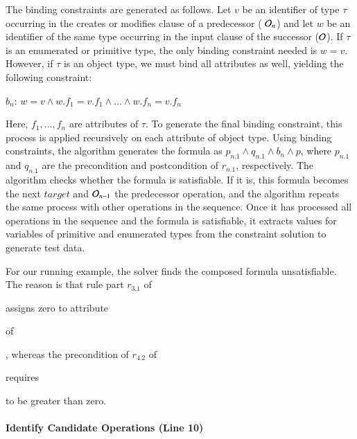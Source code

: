 The binding constraints are generated as follows. Let $v$ be an identifier of
type $\tau$ occurring in the creates or modifies clause of a predecessor (\eg
${\cal O}_n$) and let $w$ be an identifier of the same type occurring in the
input clause of the successor (\eg ${\cal O}$). If $\tau$ is an enumerated or
primitive type, the only binding constraint needed is $w = v$. However, if
$\tau$ is an object type, we must bind all attributes as well, yielding the
following constraint:

\vskip 2pt
$b_n$: $w = v \wedge w.f_1 = v.f_1 \wedge \ldots \wedge w.f_n = v.f_n$ 
\vskip 2pt

Here, $f_1, \ldots , f_n$ are attributes of $\tau$. To generate the final
binding constraint, this process is applied recursively on each attribute of
object type. Using binding constraints, the algorithm generates the formula as
$p_{n.1} \wedge q_{n.1} \wedge b_n \wedge p$, where $p_{n.1}$ and $q_{n.1}$ are
the precondition and postcondition of $r_{n.1}$, respectively. The algorithm checks whether
the formula is satisfiable.  If it is, this formula becomes the next $target$
and ${\cal O}_{n-1}$ the predecessor operation, and the algorithm repeats the
same process with other operations in the sequence.  Once it has processed all
operations in the sequence and the formula is satisfiable, it extracts values
for variables of primitive and enumerated types from the constraint solution to
generate test data.

For our running example, the solver finds the composed formula
unsatisfiable. The reason is that rule part $r_{3.1}$ of \subject{CreateOrder}
assigns zero to attribute \subject{total} of \subject{Order}, whereas the
precondition of $r_{4.2}$ of \subject{GenerateInvoice} requires \subject{total}
to be greater than zero.



\paragraph*{Identify Candidate Operations (Line 10)}

